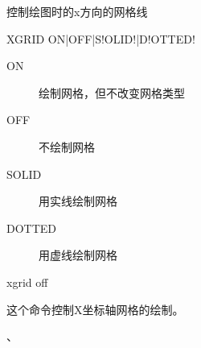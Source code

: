 \label{cmd:xgrid}

控制绘图时的x方向的网格线

\begin{SACSTX}
XGRID ON|OFF|S!OLID!|D!OTTED!
\end{SACSTX}

\begin{description}
\item [ON] 绘制网格，但不改变网格类型
\item [OFF] 不绘制网格
\item [SOLID] 用实线绘制网格
\item [DOTTED] 用虚线绘制网格
\end{description}

\begin{SACDFT}
xgrid off
\end{SACDFT}

这个命令控制X坐标轴网格的绘制。

、
